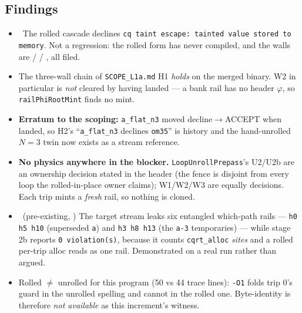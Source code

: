 \subsection*{Findings}
\begin{itemize}
  \item \foverdecline\ The rolled cascade declines \texttt{cq taint escape: tainted value stored
        to memory}. Not a regression: the rolled form has never compiled, and the walls are
         /  / , all filed.
  \item The three-wall chain of \texttt{SCOPE\_L1a.md} H1 \emph{holds} on the merged binary.
        W2 in particular is \emph{not} cleared by  having landed --- a bank rail has no
        header $\varphi$, so \texttt{railPhiRootMint} finds no mint.
  \item \textbf{Erratum to the scoping:} \texttt{a\_flat\_n3} moved decline$\rightarrow$ACCEPT
        when  landed, so H2's ``\texttt{a\_flat\_n3} declines \texttt{om35}'' is history
        and the hand-unrolled $N{=}3$ twin now exists as a stream reference.
  \item \textbf{No physics anywhere in the blocker.} \texttt{LoopUnrollPrepass}'s U2/U2b are an
        ownership decision stated in the header (the fence is disjoint from every loop the
        rolled-in-place owner claims); W1/W2/W3 are equally decisions. Each trip mints a
        \emph{fresh} rail, so nothing is cloned.
  \item \fconfirmed\ (pre-existing, ) The target stream leaks six entangled which-path
        rails --- \texttt{h0 h5 h10} (superseded \texttt{a}) and \texttt{h3 h8 h13} (the
        \texttt{a-3} temporaries) --- while stage 2b reports \texttt{0 violation(s)}, because it
        counts \texttt{cqrt\_alloc} \emph{sites} and a rolled per-trip alloc reads as one rail.
        Demonstrated on a real run rather than argued.
  \item Rolled $\neq$ unrolled for this program (50 vs 44 trace lines): \texttt{-O1} folds trip 0's
        guard in the unrolled spelling and cannot in the rolled one. Byte-identity is therefore
        \emph{not available} as this increment's witness.
\end{itemize}

